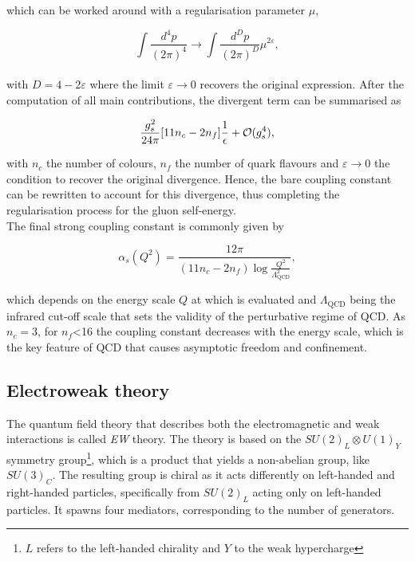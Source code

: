 which can be worked around with a regularisation parameter $\mu$,

\begin{equation*}
    \int \frac{d^4p}{(2\pi)^4}\to \int \frac{d^Dp}{(2\pi)^D}\mu^{2\varepsilon},
\end{equation*}\\

with $D=4-2\varepsilon$ where the limit $\varepsilon\to 0$ recovers the original expression. After the computation of all main contributions, the divergent term can be summarised as

\begin{equation}
    \frac{g_s^2}{24\pi}\qty[11n_c-2 n_f]\frac{1}{\epsilon}+\mathcal{O}(g_s^4),
\end{equation}

with $n_c$ the number of colours, $n_f$ the number of quark flavours and $\varepsilon\to 0$ the condition to recover the original divergence. Hence, the bare coupling constant can be rewritten to account for this divergence, thus completing the regularisation process for the gluon self-energy.\\

The final strong coupling constant is commonly given by 

\begin{equation}
    \label{Theory_eq:runningcoupling}
    \alpha_s(Q^2) = \frac{12\pi}{(11n_c - 2 n_f)\log \frac{Q^2}{\Lambda^2_\text{QCD}}},
\end{equation}

which depends on the energy scale $Q$ at which is evaluated and $\Lambda_\text{QCD}$ being the infrared cut-off scale that sets the validity of the perturbative regime of \acrshort{QCD}. As $n_c=3$, for $n_f$<16 the coupling constant decreases with the energy scale, which is the key feature of \acrshort{QCD} that causes asymptotic freedom and confinement.

\subsection{Electroweak theory}

The quantum field theory that describes both the electromagnetic and weak interactions is called \textit{\acrlong{EW}} theory. The theory is based on the $SU(2)_L\otimes U(1)_Y$ symmetry group\footnote{$L$ refers to the left-handed chirality and $Y$ to the weak hypercharge}, which is a product that yields a non-abelian group, like $SU(3)_C$. The resulting group is chiral as it acts differently on left-handed and right-handed particles, specifically from $SU(2)_L$ acting only on left-handed particles. It spawns four mediators, corresponding to the number of generators.\\

